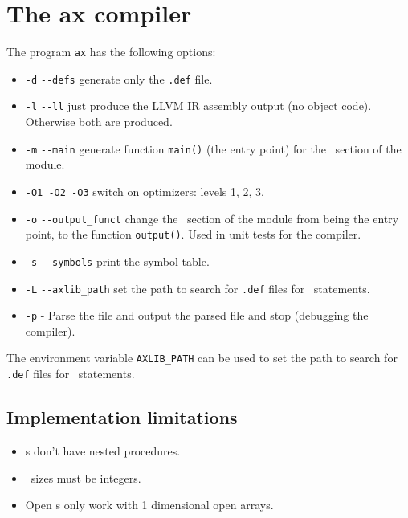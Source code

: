 \documentclass[12pt]{article}
\begin{document}
\newpage
\section{The ax compiler}

The program \lstinline"ax" has the following options: 
\begin{itemize}
    \item \lstinline"-d" \lstinline"--defs" generate only the \lstinline".def" file.
    \item \lstinline"-l" \lstinline"--ll" just produce the LLVM IR assembly output (no object code). Otherwise both are produced.
    \item \lstinline"-m" \lstinline"--main" generate function \lstinline"main()" (the entry point) for the \BEGIN\ section of the module.
    \item \lstinline"-O1 -O2 -O3" switch on optimizers: levels 1, 2, 3.
    \item \lstinline"-o" \lstinline"--output_funct" change the \BEGIN\ section of the module from being the entry point, to the function \lstinline"output()". Used in unit tests for the compiler.
    \item  \lstinline"-s" \lstinline"--symbols" print the symbol table.
    \item \lstinline"-L" \lstinline"--axlib_path" set the path to search for \lstinline".def" files for \IMPORT\ statements.
    \item \lstinline"-p" - Parse the file and output the parsed file and stop (debugging the compiler).
\end{itemize}

The environment variable \lstinline"AXLIB_PATH" can be used to set the path to search for \lstinline".def" files for \IMPORT\ statements.

\subsection{Implementation limitations}
\begin{itemize}
    \item \PROCEDURE s don't have nested procedures.
    \item \ARRAY\ sizes must be integers.
    \item Open \ARRAY s only work with 1 dimensional open arrays.
\end{itemize}
\end{document}
